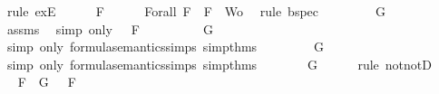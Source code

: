 \begin{isabellebody}
\ {\isacharparenleft}rule\ exE{\isacharparenright}\isanewline
\ \ \isamarkupfalse%
\ {\isachardoublequoteopen}{\isasymA}\ {\isasymTurnstile}\ F{\isachardoublequoteclose}\isanewline
\ \ \ \ \isamarkupfalse%
\ Forall{}\ {\isacartoucheopen}F\ {\isasymin}\ {\isacharbraceleft}F{\isacharbraceright}\ {\isasymunion}\ Wo{\isacartoucheclose}\ \isamarkupfalse%
\ {\isacharparenleft}rule\ bspec{\isacharparenright}\isanewline
\ \ \isamarkupfalse%
\ \isamarkupfalse%
\ {\isachardoublequoteopen}{\isasymA}\ {\isasymTurnstile}\ \isactrlbold {\isasymnot}{\isacharparenleft}\isactrlbold {\isasymnot}\ G{\isacharparenright}{\isachardoublequoteclose}\isanewline
\ \ \ \ \isamarkupfalse%
\ assms{\isacharparenleft}{}{\isacharparenright}\ \isamarkupfalse%
\ {\isacharparenleft}simp\ only{\isacharcolon}\ {\isacartoucheopen}{\isasymA}\ {\isasymTurnstile}\ F{\isacartoucheclose}{\isacharparenright}\isanewline
\ \ \isamarkupfalse%
\ \isamarkupfalse%
\ {\isachardoublequoteopen}{\isasymnot}\ {\isasymA}\ {\isasymTurnstile}\ \isactrlbold {\isasymnot}\ G{\isachardoublequoteclose}\isanewline
\ \ \ \ \isamarkupfalse%
\ {\isacharparenleft}simp\ only{\isacharcolon}\ formula{\isacharunderscore}semantics{\isachardot}simps{\isacharparenleft}{}{\isacharparenright}\ simp{\isacharunderscore}thms{\isacharparenleft}{}{\isacharparenright}{\isacharparenright}\isanewline
\ \ \isamarkupfalse%
\ \isamarkupfalse%
\ {\isachardoublequoteopen}{\isasymnot}\ {\isasymnot}{\isasymA}\ {\isasymTurnstile}\ G{\isachardoublequoteclose}\isanewline
\ \ \ \ \isamarkupfalse%
\ {\isacharparenleft}simp\ only{\isacharcolon}\ formula{\isacharunderscore}semantics{\isachardot}simps{\isacharparenleft}{}{\isacharparenright}\ simp{\isacharunderscore}thms{\isacharparenleft}{}{\isacharparenright}{\isacharparenright}\isanewline
\ \ \isamarkupfalse%
\ \isamarkupfalse%
\ {\isachardoublequoteopen}{\isasymA}\ {\isasymTurnstile}\ G{\isachardoublequoteclose}\isanewline
\ \ \ \ \isamarkupfalse%
\ {\isacharparenleft}rule\ notnotD{\isacharparenright}\isanewline
\ \ \isamarkupfalse%
\ \isamarkupfalse%
\ {}{\isacharcolon}{\isachardoublequoteopen}{\isasymforall}F\ {\isasymin}\ {\isacharbraceleft}G{\isacharbraceright}{\isachardot}\ {\isasymA}\ {\isasymTurnstile}\ F{\isachardoublequoteclose}\isanewline

\end{isabellebody}
